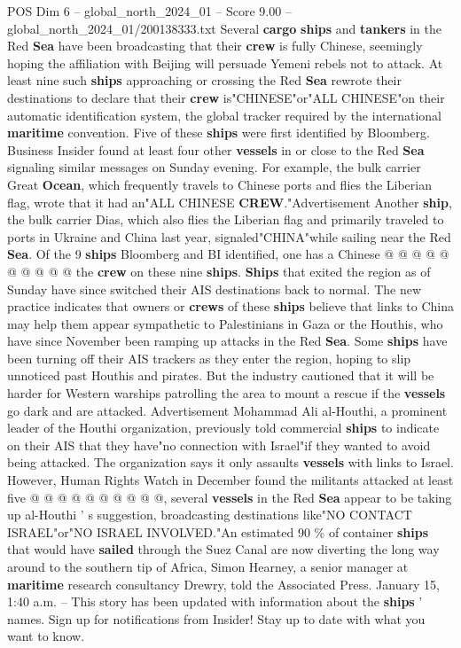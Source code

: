 \begin{textsample}{POS Dim 6 – global\_north\_2024\_01 – Score 9.00 – global\_north\_2024\_01/200138333.txt}  \label{ex:f6_pos_096}
Several \textbf{cargo} \textbf{ships} and \textbf{tankers} in the Red \textbf{Sea} have been broadcasting that their \textbf{crew} is fully Chinese, seemingly hoping the affiliation with Beijing will persuade Yemeni rebels not to attack.
At least nine such \textbf{ships} approaching or crossing the Red \textbf{Sea} rewrote their destinations to declare that their \textbf{crew} is"CHINESE"or"ALL CHINESE"on their automatic identification system, the global tracker required by the international \textbf{maritime} convention.
Five of these \textbf{ships} were first identified by Bloomberg.
Business Insider found at least four other \textbf{vessels} in or close to the Red \textbf{Sea} signaling similar messages on Sunday evening.
For example, the bulk carrier Great \textbf{Ocean}, which frequently travels to Chinese ports and flies the Liberian flag, wrote that it had an"ALL CHINESE \textbf{CREW}."Advertisement Another \textbf{ship}, the bulk carrier Dias, which also flies the Liberian flag and primarily traveled to ports in Ukraine and China last year, signaled"CHINA"while sailing near the Red \textbf{Sea}.
Of the 9 \textbf{ships} Bloomberg and BI identified, one has a Chinese @ @ @ @ @ @ @ @ @ @ the \textbf{crew} on these nine \textbf{ships}. \textbf{Ships} that exited the region as of Sunday have since switched their AIS destinations back to normal.
The new practice indicates that owners or \textbf{crews} of these \textbf{ships} believe that links to China may help them appear sympathetic to Palestinians in Gaza or the Houthis, who have since November been ramping up attacks in the Red \textbf{Sea}.
Some \textbf{ships} have been turning off their AIS trackers as they enter the region, hoping to slip unnoticed past Houthis and pirates.
But the industry cautioned that it will be harder for Western warships patrolling the area to mount a rescue if the \textbf{vessels} go dark and are attacked.
Advertisement Mohammad Ali al-Houthi, a prominent leader of the Houthi organization, previously told commercial \textbf{ships} to indicate on their AIS that they have"no connection with Israel"if they wanted to avoid being attacked.
The organization says it only assaults \textbf{vessels} with links to Israel.
However, Human Rights Watch in December found the militants attacked at least five @ @ @ @ @ @ @ @ @ @, several \textbf{vessels} in the Red \textbf{Sea} appear to be taking up al-Houthi ' s suggestion, broadcasting destinations like"NO CONTACT ISRAEL"or"NO ISRAEL INVOLVED."An estimated 90 \% of container \textbf{ships} that would have \textbf{sailed} through the Suez Canal are now diverting the long way around to the southern tip of Africa, Simon Hearney, a senior manager at \textbf{maritime} research consultancy Drewry, told the Associated Press.
January 15, 1:40 a.m. -- This story has been updated with information about the \textbf{ships} ' names.
Sign up for notifications from Insider!
Stay up to date with what you want to know.

\end{textsample}
